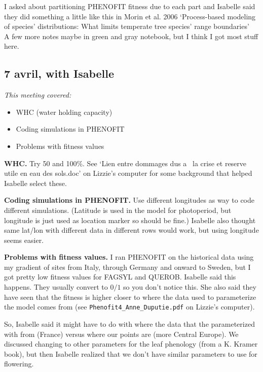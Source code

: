 \documentclass[11pt,letter]{article}
\begin{document}
I asked about partitioning PHENOFIT fitness due to each part and Isabelle said they did something a little like this in Morin et al. 2006 `Process-based modeling of species’ distributions: What limits temperate tree species’ range boundaries' \\%

A few more notes maybe in green and gray notebook, but I think I got most stuff here. 

\subsection{7 avril, with Isabelle}

\emph{This meeting covered:}
\begin{itemize}
\item WHC (water holding capacity)
\item Coding simulations in PHENOFIT
\item Problems with fitness values
\end{itemize}

{\bf WHC.} Try 50 and 100\%. See `Lien entre dommages dus a  la crise et reserve utile en eau des sols.doc' on Lizzie's computer for some background that helped Isabelle select these. 

{\bf Coding simulations in PHENOFIT.} Use different longitudes as way to code different simulations. (Latitude is used in the model for photoperiod, but longitude is just used as location marker so should be fine.) Isabelle also thought same lat/lon with different data in different rows would work, but using longitude seems easier. 

{\bf Problems with fitness values.} I ran PHENOFIT on the historical data using my gradient of sites from Italy, through Germany and onward to Sweden, but I got pretty low fitness values for FAGSYL and QUEROB. Isabelle said this happens. They usually convert to $0/1$ so you don't notice this. She also said they have seen that the fitness is higher closer to where the data used to parameterize the model comes from  (see \verb|Phenofit4_Anne_Duputie.pdf| on Lizzie's computer). 

So, Isabelle said it might have to do with where the data that the parameterized with from (France) versus where our points are (more Central Europe). We discussed changing to other parameters for the leaf phenology (from a K. Kramer book), but then Isabelle realized that we don't have similar parameters to use for flowering. 
\end{document}
